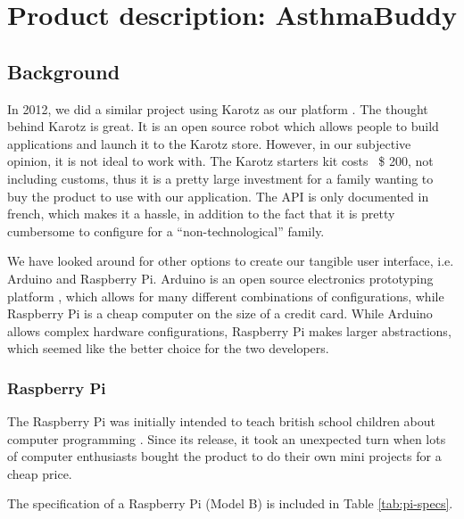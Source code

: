 
\chapter{Product description: AsthmaBuddy}
\label{chp:our-solution}

\section{Background}
In 2012, we did a similar project using Karotz  as our platform \cite{CustomerDriven}. The thought behind Karotz is great. It is an open source robot which allows people to build applications and launch it to the Karotz store. However, in our subjective opinion, it is not ideal to work with. The Karotz starters kit costs ~\$ 200, not including customs, thus it is a pretty large investment for a family wanting to buy the product to use with our application. The API is only documented in french, which makes it a hassle, in addition to the fact that it is pretty cumbersome to configure for a ``non-technological'' family. 


We have looked around for other options to create our tangible user interface, i.e. Arduino and Raspberry Pi. Arduino is an open source electronics prototyping platform \cite{arduino}, which allows for many different combinations of configurations, while Raspberry Pi is a cheap computer on the size of a credit card. 
While Arduino allows complex hardware configurations, Raspberry Pi makes larger abstractions, which seemed like the better choice for the two developers.  

\subsection{Raspberry Pi}
The Raspberry Pi was initially intended to teach british school children about computer programming \cite{rasperrypi-about}. Since its release, it took an unexpected turn when lots of computer enthusiasts bought the product to do their own mini projects for a cheap price. 

The specification of a Raspberry Pi (Model B) is included in Table \ref{tab:pi-specs}.    

